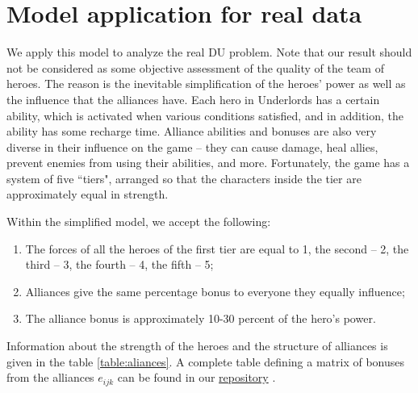 \documentclass[smallextended]{svjour3}       %
\begin{document}
\section{Model application for real data}
\label{SectionComputationalResults}
  
We apply this model to analyze the real DU problem. Note that our result should not be considered as some objective assessment of the quality of the team of heroes. The reason is the inevitable simplification of the heroes’ power as well as the influence that the alliances have. Each hero in Underlords has a certain ability, which is activated when various conditions satisfied, and in addition, the ability has some recharge time. Alliance abilities and bonuses are also very diverse in their influence on the game -- they can cause damage, heal allies, prevent enemies from using their abilities, and more. Fortunately, the game has a system of five ``tiers", arranged so that the characters inside the tier are approximately equal in strength.

Within the simplified model, we accept the following:
\begin{enumerate}
\item The forces of all the heroes of the first tier are equal to 1,  the second -- 2, the third -- 3, the fourth -- 4, the fifth -- 5;
\item Alliances give the same percentage bonus to everyone they equally influence;
\item The alliance bonus is approximately 10-30 percent of the hero’s power.
\end{enumerate}

Information about the strength of the heroes and the structure of alliances is given in the table \ref{table:aliances}. 
A complete table defining a matrix of bonuses from the alliances $e_{ijk} $ can be found in our \href{https://github.com/aponom84/UnderLords/blob/master/UnderLordsData.xlsx}{repository} \cite{UnderLordsInput}.
\end{document}

